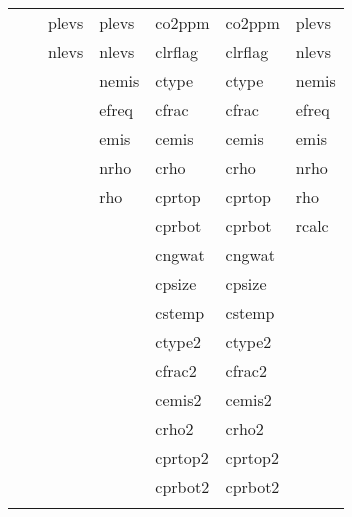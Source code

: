 \documentclass[11pt]{article}
\begin{document}
\begin{center}
\begin{tabular}{lllllll}
{{           &            &  plevs     &  plevs     &  co2ppm                &  co2ppm                &  plevs     \\
           &            &  nlevs     &  nlevs     &  clrflag               &  clrflag               &  nlevs     \\
           &            &            &  nemis     &  ctype                 &  ctype                 &  nemis     \\
           &            &            &  efreq     &  cfrac                 &  cfrac                 &  efreq     \\
           &            &            &  emis      &  cemis                 &  cemis                 &  emis      \\
           &            &            &  nrho      &  crho                  &  crho                  &  nrho      \\
           &            &            &  rho       &  cprtop                &  cprtop                &  rho       \\
           &            &            &            &  cprbot                &  cprbot                &  rcalc     \\
           &            &            &            &  cngwat                &  cngwat                &            \\
           &            &            &            &  cpsize                &  cpsize                &            \\
           &            &            &            &  cstemp                &  cstemp                &            \\
           &            &            &            &  ctype2                &  ctype2                &            \\
           &            &            &            &  cfrac2                &  cfrac2                &            \\
           &            &            &            &  cemis2                &  cemis2                &            \\
           &            &            &            &  crho2                 &  crho2                 &            \\
           &            &            &            &  cprtop2               &  cprtop2               &            \\
           &            &            &            &  cprbot2               &  cprbot2               &            \\
}}
\end{tabular}
\end{center}
\end{document}
